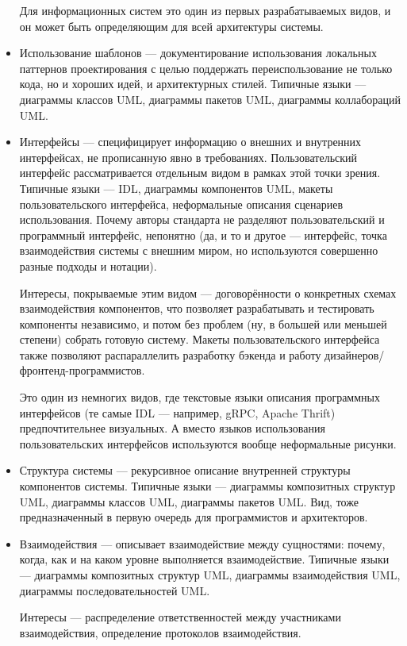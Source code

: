 \documentclass[a5paper]{article}
\begin{document}
\begin{itemize}
	Для информационных систем это один из первых разрабатываемых видов, и он может быть определяющим для всей архитектуры системы.
	
	\item Использование шаблонов --- документирование использования локальных паттернов проектирования с целью поддержать переиспользование не только кода, но и хороших идей, и архитектурных стилей. Типичные языки --- диаграммы классов UML, диаграммы пакетов UML, диаграммы коллабораций UML.
	
	\item Интерфейсы --- специфицирует информацию о внешних и внутренних интерфейсах, не прописанную явно в требованиях. Пользовательский интерфейс рассматривается отдельным видом в рамках этой точки зрения. Типичные языки --- IDL, диаграммы компонентов UML, макеты пользовательского интерфейса, неформальные описания сценариев использования. Почему авторы стандарта не разделяют пользовательский и программный интерфейс, непонятно (да, и то и другое --- интерфейс, точка взаимодействия системы с внешним миром, но используются совершенно разные подходы и нотации).
	
	Интересы, покрываемые этим видом --- договорённости о конкретных схемах взаимодействия компонентов, что позволяет разрабатывать и тестировать компоненты независимо, и потом без проблем (ну, в большей или меньшей степени) собрать готовую систему. Макеты пользовательского интерфейса также позволяют распараллелить разработку бэкенда и работу дизайнеров/фронтенд-программистов.
	
	Это один из немногих видов, где текстовые языки описания программных интерфейсов (те самые IDL --- например, gRPC, Apache Thrift) предпочтительнее визуальных. А вместо языков использования пользовательских интерфейсов используются вообще неформальные рисунки.
	
	\item Структура системы --- рекурсивное описание внутренней структуры компонентов системы. Типичные языки --- диаграммы композитных структур UML, диаграммы классов UML, диаграммы пакетов UML. Вид, тоже предназначенный в первую очередь для программистов и архитекторов.
	
	\item Взаимодействия --- описывает взаимодействие между сущностями: почему, когда, как и на каком уровне выполняется взаимодействие. Типичные языки --- диаграммы композитных структур UML, диаграммы взаимодействия UML, диаграммы последовательностей UML.
	
	Интересы --- распределение ответственностей между участниками взаимодействия, определение протоколов взаимодействия.
	

\end{itemize}
\end{document}
